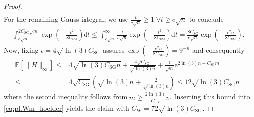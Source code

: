 \begin{proof}
\begin{align}
  \end{align}
  For the remaining Gauss integral, we use $\frac{t}{c \sqrt{n}} \geq 1\; \forall t \geq c\sqrt{n}$ to conclude
  \begin{align}
    \int_{c \sqrt{n}}^{2 C_\mathrm{SG} \sqrt{m}}  \exp \left( - \frac{t^2}{8 C_\mathrm{SG}} \right) \mathrm{d}t
    \leq  \int_{c \sqrt{n}}^\infty \frac{t}{c \sqrt{n}}  \exp \left( - \frac{t^2}{8 C_\mathrm{SG}} \right) \mathrm{d} t
    = \frac{8 C_\mathrm{SG}}{c \sqrt{n}} \exp \left( - \frac{c^2 n}{8 C_\mathrm{SG}} \right).
  \end{align}
  Now, fixing $c = 4 \sqrt{\ln (3)C_\mathrm{SG}}$ assures $\exp \left( -\frac{c^2 n}{8 C_\mathrm{SG}}\right) = 9^{-n}$ and consequently
  \begin{align}
    \mathbb{E} \left[ \|  H \|_\infty \right]
    \leq & 4  \sqrt{ \ln (3) C_\mathrm{SG} n} + \frac{4 \sqrt{C_\mathrm{SG}}}{\sqrt{ \ln (3) n}} + \frac{4}{\sqrt{m}} \mathrm{e}^{2 \ln (3) n - C_\mathrm{SG} m} \\
    \leq & 4\sqrt{C_\mathrm{SG}} \left( \sqrt{ \ln (3) n} + \frac{2}{\sqrt{ \ln (3) n}} \right) \leq 12 \sqrt{ \ln (3) C_\mathrm{SG} n}.
  \end{align}
  where the second inequality follows from $m \geq \frac{2 \ln (3)}{C_\mathrm{SG}} n$. Inserting this bound into \eqref{eq:pl.Wm_hoelder} yields the claim with $C_\mathrm{W} = 72 \sqrt{ \ln (3) C_\mathrm{SG}}$.
\end{proof}

